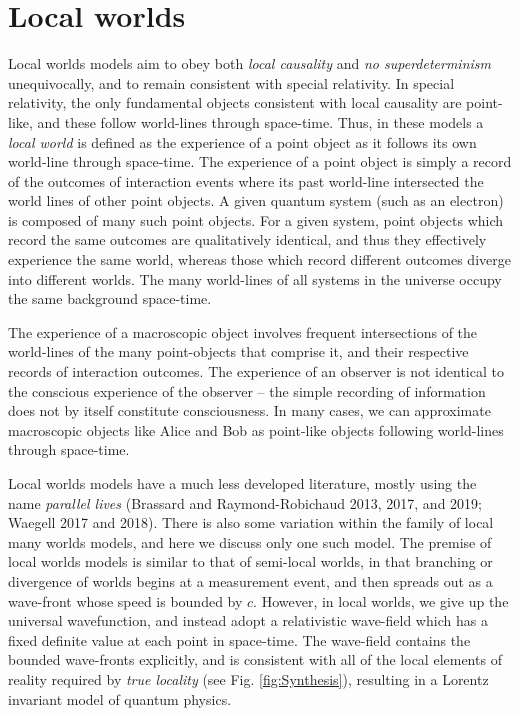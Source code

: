 \documentclass[12pt]{article}
\begin{document}
\section{Local worlds} \label{LocalWorlds}

Local worlds models aim to obey both \textit{local causality} and \textit{no superdeterminism} unequivocally, and to remain consistent with special relativity. In special relativity, the only fundamental objects consistent with local causality are point-like, and these follow world-lines through space-time. Thus, in these models a \textit{local world} is defined as the experience of a point object as it follows its own world-line through space-time.  The experience of a point object is simply a record of the outcomes of interaction events where its past world-line intersected the world lines of other point objects. A given quantum system (such as an electron) is composed of many such point objects. For a given system, point objects which record the same outcomes are qualitatively identical, and thus they effectively experience the same world, whereas those which record different outcomes diverge into different worlds.  The many world-lines of all systems in the universe occupy the same background space-time. 

The experience of a macroscopic object involves frequent intersections of the world-lines of the many point-objects that comprise it, and their respective records of interaction outcomes. The experience of an observer is not identical to the conscious experience of the observer -- the simple recording of information does not by itself constitute consciousness.  In many cases, we can approximate macroscopic objects like Alice and Bob as point-like objects following world-lines through space-time.

Local worlds models have a much less developed literature, mostly using the name \emph{parallel lives} (Brassard and Raymond-Robichaud 2013, 2017, and 2019; Waegell 2017 and 2018).  There is also some variation within the family of local many worlds models, and here we discuss only one such model.  The premise of local worlds models is similar to that of semi-local worlds, in that branching or divergence of worlds begins at a measurement event, and then spreads out as a wave-front whose speed is bounded by $c$.  However, in local worlds, we give up the universal wavefunction, and instead adopt a relativistic wave-field which has a fixed definite value at each point in space-time.  The wave-field contains the bounded wave-fronts explicitly, and is consistent with all of the local elements of reality required by \textit{true locality} (see Fig. \ref{fig:Synthesis}), resulting in a Lorentz invariant model of quantum physics.  
\end{document}
